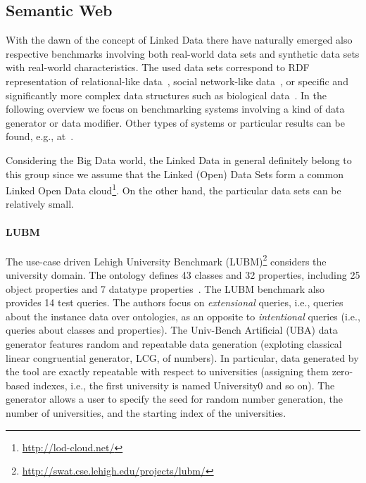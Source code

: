 \subsection{Semantic Web}
\label{sec:generators_LinkedData}
With the dawn of the concept of Linked Data there have naturally emerged also respective benchmarks involving both real-world data sets and synthetic data sets with real-world characteristics. The used data sets correspond to RDF representation of relational-like data~\cite{Guo2005158,Bizer09theberlin}, social network-like data~\cite{Schmidt2010}, or specific and significantly more complex data structures such as biological data~\cite{Wu2014}. In the following overview we focus on benchmarking systems involving a kind of data generator or data modifier. Other types of systems or particular results can be found, e.g., at~\cite{RdfStoreBenchmarking}.

Considering the Big Data world, the Linked Data in general definitely belong to this group since we assume that the Linked (Open) Data Sets form a common Linked Open Data cloud\footnote{\url{http://lod-cloud.net/}}. On the other hand, the particular data sets can be relatively small.

\paragraph{LUBM} The use-case driven Lehigh University Benchmark (LUBM)\footnote{\url{http://swat.cse.lehigh.edu/projects/lubm/}} considers the university domain. The ontology defines 43 classes and 32 properties, including 25 object properties and 7 datatype properties~\cite{Guo2005158}. The LUBM benchmark also provides 14 test queries. The authors focus on \emph{extensional} queries, i.e., queries about the instance data over ontologies, as an opposite to \emph{intentional} queries (i.e., queries about classes and properties). The Univ-Bench Artificial  (UBA) data generator features random and repeatable data generation (exploting classical linear congruential generator, LCG, of numbers). In particular, data generated by the tool are exactly repeatable with respect to universities (assigning them zero-based indexes, i.e., the first university is named University0 and so on).  The generator allows a user to specify the seed for random number generation, the number of universities, and the starting index of the universities.

